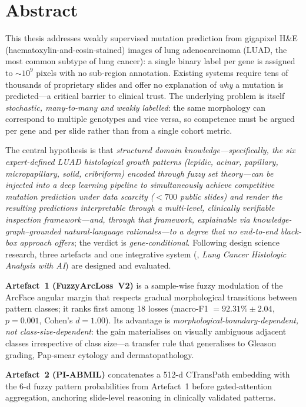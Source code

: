 \chapter*{Abstract}

This thesis addresses weakly supervised mutation prediction from
gigapixel H\&E (haematoxylin-and-eosin-stained) images of lung
adenocarcinoma (LUAD, the most common subtype of lung cancer): a
single binary label per gene is assigned to $\sim\!10^9$ pixels
with no sub-region annotation. Existing systems require tens of thousands
of proprietary slides and offer no explanation of \emph{why} a
mutation is predicted---a critical barrier to clinical trust. The
underlying problem is itself \emph{stochastic, many-to-many and
weakly labelled}: the same morphology can correspond to multiple
genotypes and vice versa, so competence must be argued per gene
and per slide rather than from a single cohort metric.

The central hypothesis is that \emph{structured domain
knowledge---specifically, the six expert-defined LUAD histological
growth patterns
(lepidic, acinar, papillary, micropapillary, solid, cribriform)
encoded through fuzzy set theory---can be injected into a deep
learning pipeline to simultaneously achieve competitive mutation
prediction under data scarcity ($<\!700$ public slides) and render
the resulting predictions \emph{interpretable} through a
multi-level, clinically verifiable inspection framework---and,
through that framework, \emph{explainable} via
knowledge-graph--grounded natural-language rationales---to a
degree that no end-to-end black-box approach offers}; the verdict
is \emph{gene-conditional}.
Following design science research, three artefacts and one
integrative system (\lchai{}, \emph{Lung Cancer Histologic
Analysis with AI}) are designed and evaluated.

\textbf{Artefact~1 (FuzzyArcLoss~V2)} is a sample-wise fuzzy
modulation of the ArcFace angular margin that respects gradual
morphological transitions between pattern classes; it ranks
first among 18 losses (macro-F1 $= 92.31\%\!\pm\!2.04$,
$p\!=\!0.001$, Cohen's $d\!=\!1.00$). Its advantage is
\emph{morphological-boundary-dependent, not class-size-dependent}:
the gain materialises on visually ambiguous adjacent classes
irrespective of class size---a transfer rule that generalises to
Gleason grading, Pap-smear cytology and dermatopathology.

\textbf{Artefact~2 (PI-ABMIL)} concatenates a 512-d CTransPath
embedding with the 6-d fuzzy pattern probabilities from
Artefact~1 before gated-attention aggregation, anchoring
slide-level reasoning in clinically validated patterns.

